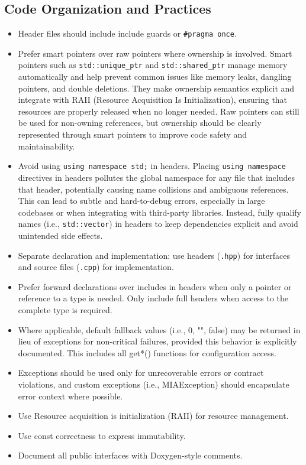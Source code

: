 \subsection{Code Organization and Practices}
\begin{itemize}
    \item Header files should include include guards or \texttt{\#pragma once}.
    \item Prefer smart pointers over raw pointers where ownership is involved. Smart pointers such as \texttt{std::unique\_ptr} and \texttt{std::shared\_ptr} manage memory automatically and help prevent common issues like memory leaks, dangling pointers, and double deletions. They make ownership semantics explicit and integrate with RAII (Resource Acquisition Is Initialization), ensuring that resources are properly released when no longer needed. Raw pointers can still be used for non-owning references, but ownership should be clearly represented through smart pointers to improve code safety and maintainability.    
    \item Avoid using \texttt{using namespace std;} in headers. Placing \texttt{using namespace} directives in headers pollutes the global namespace for any file that includes that header, potentially causing name collisions and ambiguous references. This can lead to subtle and hard-to-debug errors, especially in large codebases or when integrating with third-party libraries. Instead, fully qualify names (i.e., \texttt{std::vector}) in headers to keep dependencies explicit and avoid unintended side effects.
    \item Separate declaration and implementation: use headers (\texttt{.hpp}) for interfaces and source files (\texttt{.cpp}) for implementation.
    \item Prefer forward declarations over includes in headers when only a pointer or reference to a type is needed. Only include full headers when access to the complete type is required.
    \item Where applicable, default fallback values (i.e., 0, "", false) may be returned in lieu of exceptions for non-critical failures, provided this behavior is explicitly documented. This includes all get*() functions for configuration access.
    \item Exceptions should be used only for unrecoverable errors or contract violations, and custom exceptions (i.e., MIAException) should encapsulate error context where possible.
    \item Use Resource acquisition is initialization (RAII) for resource management.
    \item Use const correctness to express immutability.
    \item Document all public interfaces with Doxygen-style comments.
\end{itemize}



